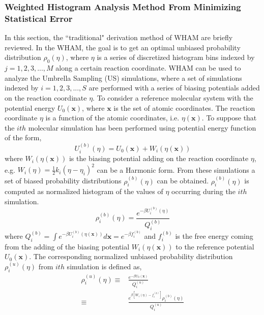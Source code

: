\subsubsection{Weighted Histogram Analysis Method From Minimizing Statistical Error}
In this section, the ``traditional" derivation method of WHAM are briefly reviewed.\cite{SouailleCPC2001} In the WHAM, the goal is to get an optimal unbiased probability distribution $\rho_{0}(\eta)$, where $\eta$ is a series of discretized histogram bins indexed by ${j=1,2,3,...,M}$ along a certain reaction coordinate. WHAM can be used to analyze the Umbrella Sampling (US) simulations, where a set of simulations indexed by ${i=1,2,3,...,S}$ are performed with a series of biasing potentials added on the reaction coordinate $\eta$. To consider a reference molecular system with the potential energy $U_{0}(\textbf{x})$, where $\textbf{x}$ is the set of atomic coordinates. The reaction coordinate $\eta$ is a function of the atomic coordinates, i.e. $\eta(\textbf{x})$. To suppose that the $ith$ molecular simulation has been performed using potential energy function of the form,
\begin{equation}
U_{i}^{(b)}(\eta) = U_{0}(\textbf{x}) + W_{i}(\eta(\textbf{x}))
\label{Eq:biasmd}
\end{equation}
where $W_{i}(\eta(\textbf{x}))$ is the biasing potential adding on the reaction coordinate $\eta$, e.g. $W_{i}(\eta)=\frac{1}{2}k_{i}(\eta-\eta_{i})^2$ can be a Harmonic form. From these simulations a set of biased probability distributions ${\rho_{i}^{(b)}(\eta)}$ can be obtained. $\rho_{i}^{(b)}(\eta)$ is computed as normalized histogram of the values of $\eta$ occurring during the $ith$ simulation. 
\begin{equation}
\rho_{i}^{(b)}(\eta) = \frac{e^{-\beta U_{i}^{(b)}(\eta)}}{Q_{i}^{(b)}}
\label{Eq:bias}
\end{equation}
where $Q_{i}^{(b)}=\int e^{-\beta U_{i}^{(b)}(\eta(\textbf{x}))} d\textbf{x}=e^{-\beta f_{i}^{(b)}}$ and $f_{i}^{(b)}$ is the free energy coming from the adding of the biasing potential $W_{i}(\eta(\textbf{x}))$ to the reference potential $U_{0}(\textbf{x})$. 
The corresponding normalized unbiased probability distribution $\rho_{i}^{(u)}(\eta)$ from $ith$ simulation is defined as, 
\begin{align}
\rho_{i}^{(u)}(\eta) \equiv &\frac{e^{-\beta U_{0}(\textbf{x})}}{Q_{i}^{(u)}} \\
\equiv &\frac{e^{\beta[W_{i}(\eta)-f_{i}^{(b)}]}\rho_{i}^{(b)}(\eta)}{Q_{i}^{(u)}}
\label{Eq:unbias}
\end{align}
